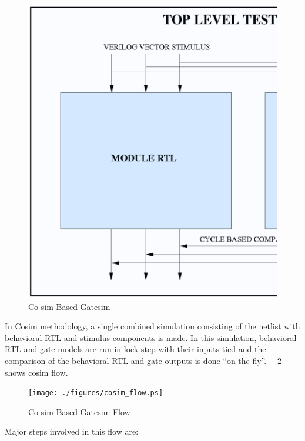 \begin{figure}[h!]
\centering
\includegraphics[scale=0.35]{./figures/cosim.ps}
\caption{Co-sim Based Gatesim}
\label{fig:cosim.ps}
\end{figure}


 In Cosim methodology, a single combined simulation consisting of the netlist with behavioral RTL and stimulus components is made. In this simulation, behavioral RTL and gate models are run in lock-step with their inputs tied and the comparison of the behavioral RTL and gate outputs is done ``on the fly''. ~\figurename{~\ref{fig:cosim_flow.ps}} shows cosim flow.




\begin{figure}[h]
\centering
\texttt{[image: ./figures/cosim\_flow.ps]}
\caption{Co-sim Based Gatesim Flow}
\label{fig:cosim_flow.ps}
\end{figure}

Major steps involved in this flow are:

